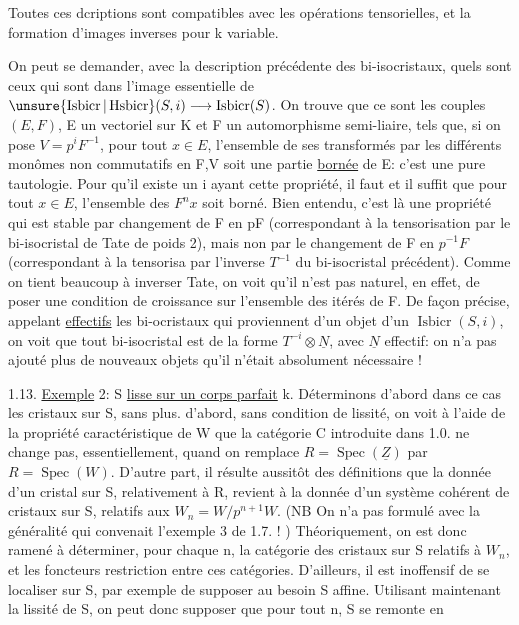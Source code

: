 
Toutes ces dcriptions sont compatibles avec les opérations tensorielles, et la formation d'images inverses pour k variable.

On peut se demander, avec la description précédente des bi-isocristaux, quels sont ceux qui sont dans l'image essentielle de $\unsure{\operatorname{Isbicr}|\operatorname{Hsbicr}}(S,i)\longrightarrow\operatorname{Isbicr}(S)$. On trouve que ce sont les couples $(E,F)$, E un vectoriel sur K et F un automorphisme semi-liaire, tels que, si on pose $V=p^iF^{-1}$, pour tout $x\in E$, l'ensemble de ses transformés par les différents monômes non commutatifs en F,V soit une partie \uline{bornée} de E: c'est une pure tautologie. Pour qu'il existe un i ayant cette propriété, il faut et il suffit que pour tout $x\in E$, l'ensemble des $F^nx$ soit borné. Bien entendu, c'est là une propriété qui est stable par changement de F en pF (correspondant à la tensorisation par le bi-isocristal de Tate de poids 2), mais non par le changement de F en $p^{-1}F$ (correspondant à la tensorisa par l'inverse $T^{-1}$ du bi-isocristal précédent). Comme on tient beaucoup à inverser Tate, on voit qu'il n'est pas naturel, en effet, de poser une condition de croissance sur l'ensemble des  itérés de F. De façon précise, appelant \uline{effectifs} les bi-ocristaux qui proviennent d'un objet d'un $\operatorname{Isbicr}(S,i)$, on voit que tout bi-isocristal est de la forme $T^{-i}\otimes\underline N$, avec $\underline N$ effectif: on n'a pas ajouté plus de nouveaux objets qu'il n'était absolument nécessaire !

1.13. \uline{Exemple} 2: S \uline{lisse sur un corps parfait} k. Déterminons d'abord dans ce cas les cristaux sur S, sans plus.  d'abord, sans condition de lissité, on voit à l'aide de la propriété caractéristique de W que la catégorie C introduite dans 1.0. ne change pas, essentiellement, quand on remplace $R=\operatorname{Spec}(\underline Z)$ par $R=\operatorname{Spec}(W)$. D'autre part, il résulte aussitôt des définitions que la donnée d'un cristal sur S, relativement à R, revient à la donnée d'un système cohérent de cristaux sur S, relatifs aux $W_n=W/p^{n+1}W$. (NB On n'a pas formulé avec la généralité qui convenait l'exemple 3 de 1.7. ! ) Théoriquement, on est donc ramené à déterminer, pour chaque n, la catégorie des cristaux sur S relatifs à $W_n$, et les foncteurs restriction entre ces catégories. D'ailleurs, il est inoffensif de se localiser sur S,  par exemple de supposer au besoin S affine. Utilisant maintenant la lissité de S, on peut donc supposer que pour tout n, S se remonte en
